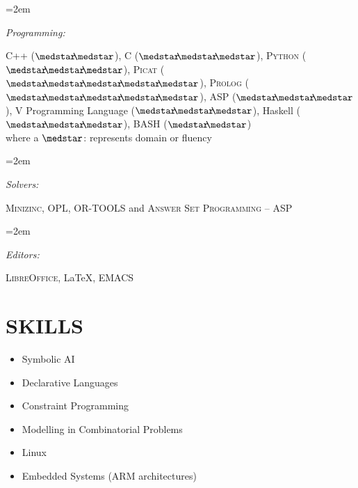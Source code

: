 \documentclass[paper=a4,fontsize=11pt]{scrartcl} %
\newlength{\spacebox}
\newcommand{\NewPart}[1]{\section*{\uppercase{#1}}}
\newcommand{\PersonalEntry}[2]{
		\noindent\hangindent=2em\hangafter=0 %
		\parbox{\spacebox}{        %
		\textit{#1}}		       %
		\hspace{1.5em} #2 \par}    %
\newcommand{\SkillsEntry}[2]{      %
		\noindent\hangindent=2em\hangafter=0 %
		\parbox{\spacebox}{        %
		\textit{#1}}			   %
		\hspace{1.5em} #2 \par}    %
\begin{document}
\SkillsEntry{Programming:} {\textsc{C++} ($\medstar\hspace{-1mm}\medstar$), \textsc{C} ($\medstar\hspace{-1mm}\medstar\hspace{-1mm}\medstar$), \textsc{Python} ($\medstar\hspace{-1mm}\medstar\hspace{-1mm}\medstar$), \textsc{Picat} ($\medstar\hspace{-1mm}\medstar\hspace{-1mm}\medstar\hspace{-1mm}\medstar\hspace{-1mm}\medstar$),  \textsc{Prolog} 
($\medstar\hspace{-1mm}\medstar\hspace{-1mm}\medstar\hspace{-1mm}\medstar\hspace{-1mm}\medstar$), ASP
($\medstar\hspace{-1mm}\medstar\hspace{-1mm}\medstar$),  V Programming Language ($\medstar\hspace{-1mm}\medstar\hspace{-1mm}\medstar$), Haskell 
($\medstar\hspace{-1mm}\medstar\hspace{-1mm}\medstar$), BASH ($\medstar\hspace{-1mm}\medstar$) \\ where a $\medstar$: represents domain or fluency}

\SkillsEntry{Solvers:} {\textsc{Minizinc}, \textsc{OPL},
 \textsc{OR-TOOLS} and  \textsc{Answer Set Programming -- ASP}}

\SkillsEntry{Editors:} {\textsc{LibreOffice}, \LaTeX, \textsc{EMACS}}



\NewPart{Skills}{}

\begin{itemize}
\setlength\itemsep{-2mm}
\item Symbolic AI
\item Declarative Languages
\item Constraint Programming
\item Modelling in Combinatorial Problems
\item Linux
\item Embedded Systems (ARM architectures)

\end{itemize}
\end{document}
